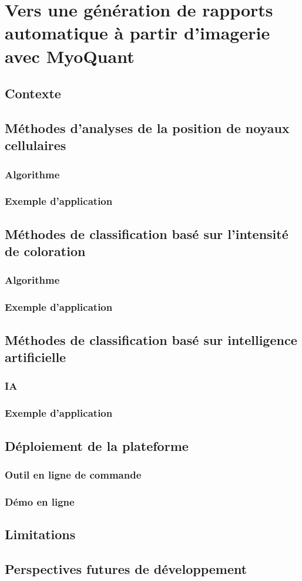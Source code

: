 \chapter{Vers une génération de rapports automatique à partir d’imagerie avec MyoQuant}
\section{Contexte}
\section{Méthodes d'analyses de la position de noyaux cellulaires}
\subsection{Algorithme}
\subsection{Exemple d'application}
\section{Méthodes de classification basé sur l'intensité de coloration}
\subsection{Algorithme}
\subsection{Exemple d'application}
\section{Méthodes de classification basé sur intelligence artificielle}
\subsection{IA}
\subsection{Exemple d'application}
\section{Déploiement de la plateforme}
\subsection{Outil en ligne de commande}
\subsection{Démo en ligne}
\section{Limitations}
\section{Perspectives futures de développement}